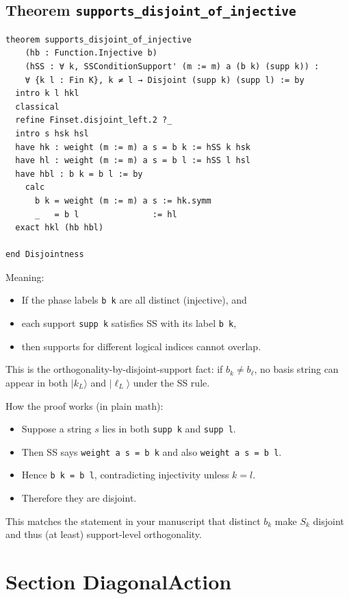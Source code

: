 \documentclass[11pt]{article}
\newcommand{\ket}[1]{\lvert #1 \rangle}
\begin{document}
\subsection*{Theorem \texttt{supports\_disjoint\_of\_injective}}

\begin{lstlisting}
theorem supports_disjoint_of_injective
    (hb : Function.Injective b)
    (hSS : ∀ k, SSConditionSupport' (m := m) a (b k) (supp k)) :
    ∀ {k l : Fin K}, k ≠ l → Disjoint (supp k) (supp l) := by
  intro k l hkl
  classical
  refine Finset.disjoint_left.2 ?_
  intro s hsk hsl
  have hk : weight (m := m) a s = b k := hSS k hsk
  have hl : weight (m := m) a s = b l := hSS l hsl
  have hbl : b k = b l := by
    calc
      b k = weight (m := m) a s := hk.symm
      _   = b l               := hl
  exact hkl (hb hbl)

end Disjointness
\end{lstlisting}

Meaning:
\begin{itemize}
\item If the phase labels \texttt{b k} are all distinct (injective), and
\item each support \texttt{supp k} satisfies SS with its label \texttt{b k},
\item then supports for different logical indices cannot overlap.
\end{itemize}

This is the orthogonality-by-disjoint-support fact: if $b_k\neq b_\ell$, no basis string can appear in both
$\ket{k_L}$ and $\ket{\ell_L}$ under the SS rule.

How the proof works (in plain math):
\begin{itemize}
\item Suppose a string $s$ lies in both \texttt{supp k} and \texttt{supp l}.
\item Then SS says \texttt{weight a s = b k} and also \texttt{weight a s = b l}.
\item Hence \texttt{b k = b l}, contradicting injectivity unless $k=l$.
\item Therefore they are disjoint.
\end{itemize}

This matches the statement in your manuscript that distinct $b_k$ make $S_k$ disjoint and thus (at least) support-level orthogonality.

\section*{Section DiagonalAction}
\end{document}
